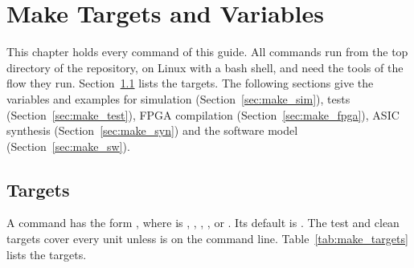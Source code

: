 \chapter{Make Targets and Variables}
\label{ch:make}

This chapter holds every  command of this guide. All commands run from
the top directory of the repository, on Linux with a bash shell, and need the
tools of the flow they run. Section~\ref{sec:make_targets} lists the targets. The
following sections give the variables and examples for simulation
(Section~\ref{sec:make_sim}), tests (Section~\ref{sec:make_test}), FPGA compilation
(Section~\ref{sec:make_fpga}), ASIC synthesis (Section~\ref{sec:make_syn}) and the
software model (Section~\ref{sec:make_sw}).

\section{Targets}
\label{sec:make_targets}

A command has the form , where  is
, , , ,  or . Its default is
. The test and clean targets cover every unit unless  is on the
command line. Table~\ref{tab:make_targets} lists the targets.

